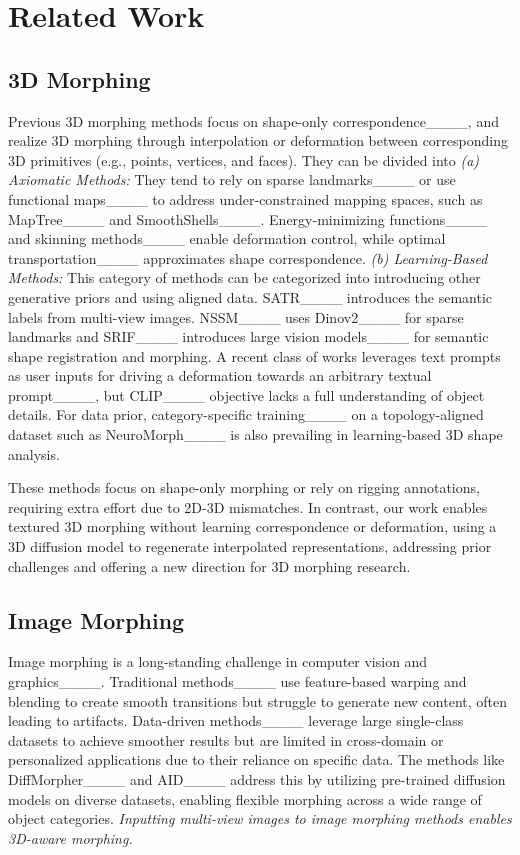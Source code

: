 \section{Related Work}
\subsection{3D Morphing}

Previous 3D morphing methods focus on shape-only correspondence____, and realize 3D morphing through interpolation or deformation between corresponding 3D primitives (e.g., points, vertices, and faces). They can be divided into \textit{(a) Axiomatic Methods:} They tend to rely on sparse landmarks____ or use functional maps____ to address under-constrained mapping spaces, such as MapTree____ and SmoothShells____. Energy-minimizing functions____ and skinning methods____ enable deformation control, while optimal transportation____ approximates shape correspondence. \textit{(b) Learning-Based Methods:} This category of methods can be categorized into introducing other generative priors and using aligned data. SATR____ introduces the semantic labels from multi-view images. NSSM____ uses Dinov2____ for sparse landmarks and SRIF____ introduces large vision models____ for semantic shape registration and morphing. A recent class of works leverages text prompts as user inputs for driving a deformation towards an arbitrary textual prompt____, but CLIP____ objective lacks a full understanding of object details. For data prior, category-specific training____ on a topology-aligned dataset such as NeuroMorph____ is also prevailing in learning-based 3D shape analysis. 

These methods focus on shape-only morphing or rely on rigging annotations, requiring extra effort due to 2D-3D mismatches. In contrast, our work enables textured 3D morphing without learning correspondence or deformation, using a 3D diffusion model to regenerate interpolated representations, addressing prior challenges and offering a new direction for 3D morphing research.

\vspace{-0.4cm}
\subsection{Image Morphing}

Image morphing is a long-standing challenge in computer vision and graphics____. Traditional methods____ use feature-based warping and blending to create smooth transitions but struggle to generate new content, often leading to artifacts. Data-driven methods____ leverage large single-class datasets to achieve smoother results but are limited in cross-domain or personalized applications due to their reliance on specific data. The methods like DiffMorpher____ and AID____ address this by utilizing pre-trained diffusion models on diverse datasets, enabling flexible morphing across a wide range of object categories. \textit{Inputting multi-view images to image morphing methods enables 3D-aware morphing.}

